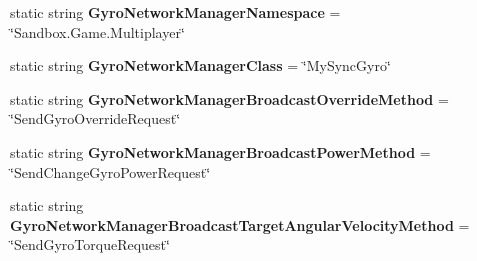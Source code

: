 \begin{DoxyCompactItemize}
\item 
\hypertarget{class_s_e_mod_a_p_i_internal_1_1_a_p_i_1_1_entity_1_1_sector_1_1_sector_object_1_1_cube_grid_1_1822c814d32081cd79efd93b6076f24a9_a69a02b8ab76ddc8d0241a765f857b206}{}static string {\bfseries Gyro\+Network\+Manager\+Namespace} = \char`\"{}Sandbox.\+Game.\+Multiplayer\char`\"{}\label{class_s_e_mod_a_p_i_internal_1_1_a_p_i_1_1_entity_1_1_sector_1_1_sector_object_1_1_cube_grid_1_1822c814d32081cd79efd93b6076f24a9_a69a02b8ab76ddc8d0241a765f857b206}

\item 
\hypertarget{class_s_e_mod_a_p_i_internal_1_1_a_p_i_1_1_entity_1_1_sector_1_1_sector_object_1_1_cube_grid_1_1822c814d32081cd79efd93b6076f24a9_a82ad76bcf68af8cbe49d40a52b052d5f}{}static string {\bfseries Gyro\+Network\+Manager\+Class} = \char`\"{}My\+Sync\+Gyro\char`\"{}\label{class_s_e_mod_a_p_i_internal_1_1_a_p_i_1_1_entity_1_1_sector_1_1_sector_object_1_1_cube_grid_1_1822c814d32081cd79efd93b6076f24a9_a82ad76bcf68af8cbe49d40a52b052d5f}

\item 
\hypertarget{class_s_e_mod_a_p_i_internal_1_1_a_p_i_1_1_entity_1_1_sector_1_1_sector_object_1_1_cube_grid_1_1822c814d32081cd79efd93b6076f24a9_a91de9796e0512f9ca50f8171aa307a30}{}static string {\bfseries Gyro\+Network\+Manager\+Broadcast\+Override\+Method} = \char`\"{}Send\+Gyro\+Override\+Request\char`\"{}\label{class_s_e_mod_a_p_i_internal_1_1_a_p_i_1_1_entity_1_1_sector_1_1_sector_object_1_1_cube_grid_1_1822c814d32081cd79efd93b6076f24a9_a91de9796e0512f9ca50f8171aa307a30}

\item 
\hypertarget{class_s_e_mod_a_p_i_internal_1_1_a_p_i_1_1_entity_1_1_sector_1_1_sector_object_1_1_cube_grid_1_1822c814d32081cd79efd93b6076f24a9_a7073b6a8963529e5066a69cbe5e9c206}{}static string {\bfseries Gyro\+Network\+Manager\+Broadcast\+Power\+Method} = \char`\"{}Send\+Change\+Gyro\+Power\+Request\char`\"{}\label{class_s_e_mod_a_p_i_internal_1_1_a_p_i_1_1_entity_1_1_sector_1_1_sector_object_1_1_cube_grid_1_1822c814d32081cd79efd93b6076f24a9_a7073b6a8963529e5066a69cbe5e9c206}

\item 
\hypertarget{class_s_e_mod_a_p_i_internal_1_1_a_p_i_1_1_entity_1_1_sector_1_1_sector_object_1_1_cube_grid_1_1822c814d32081cd79efd93b6076f24a9_a41ac634669042d851f15ffedc536af49}{}static string {\bfseries Gyro\+Network\+Manager\+Broadcast\+Target\+Angular\+Velocity\+Method} = \char`\"{}Send\+Gyro\+Torque\+Request\char`\"{}\label{class_s_e_mod_a_p_i_internal_1_1_a_p_i_1_1_entity_1_1_sector_1_1_sector_object_1_1_cube_grid_1_1822c814d32081cd79efd93b6076f24a9_a41ac634669042d851f15ffedc536af49}

\end{DoxyCompactItemize}
